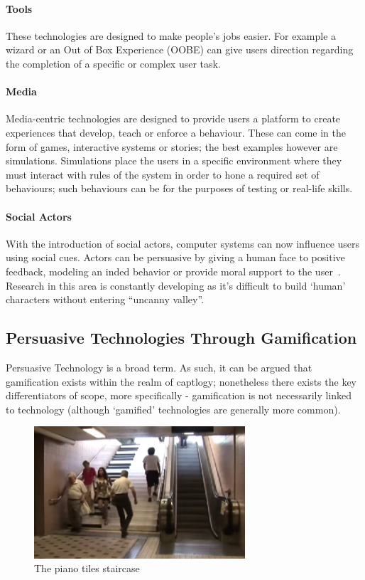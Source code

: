 \paragraph{Tools}
These technologies are designed to make people's jobs easier\cite{??}. For example a wizard or an Out of Box Experience (OOBE) can give users direction regarding the completion of a specific or complex user task.
\paragraph{Media}
Media-centric technologies are designed to provide users a platform to create experiences that develop, teach or enforce a behaviour. These can come in the form of games, interactive systems or stories;  the best examples however are simulations. Simulations place the users in a specific environment where they must interact with rules of the system in order to hone a required set of behaviours; such behaviours can be for the purposes of testing or real-life skills. 
\paragraph{Social Actors}
With the introduction of social actors, computer systems can now influence users using social cues. Actors can be persuasive by giving a human face to positive feedback, modeling an inded behavior or provide moral support to the user~\cite{fogg}. Research in this area is constantly developing as it's difficult to build `human' characters without entering ``uncanny valley''.
 

\subsection{Persuasive Technologies Through Gamification}
Persuasive Technology is a broad term. As such, it can be argued that gamification exists within the realm of captlogy; nonetheless there exists the key differentiators of scope, more specifically - gamification is not necessarily linked to technology (although `gamified' technologies are generally more common).

\begin{figure}[H]
  \centering
    \includegraphics[width=0.7\textwidth]{img/pianotiles.png}
      \caption{The piano tiles staircase}
\end{figure}

